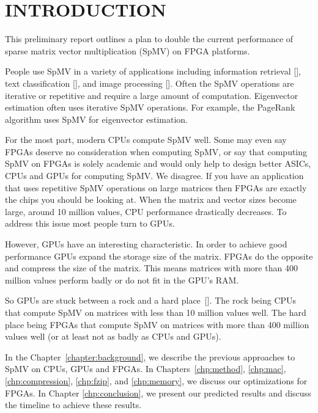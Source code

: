 \chapter{INTRODUCTION}
\label{chapter:introduction}
This preliminary report outlines a plan to double the current performance of sparse matrix vector multiplication (SpMV) on FPGA platforms.
\par People use SpMV in a variety of applications including information retrieval [\cite{prelim:page}], text classification [\cite{prelim:townsend2}], and image processing [\cite{prelim:wang}]. Often the SpMV operations are iterative or repetitive and require a large amount of computation. Eigenvector estimation often uses iterative SpMV operations. For example, the PageRank algorithm uses SpMV for eigenvector estimation.
\par For the most part, modern CPUs compute SpMV well. Some may even say FPGAs deserve no consideration when computing SpMV, or say that computing SpMV on FPGAs is solely academic and would only help to design better ASICs, CPUs and GPUs for computing SpMV. We disagree. If you have  an application that uses repetitive SpMV operations on large matrices then FPGAs are exactly the chips you should be looking at. When the matrix and vector sizes  become large, around 10 million values, CPU performance drastically decreases. To address this issue most people turn to GPUs.
\par However, GPUs have an interesting characteristic. In order to achieve good performance GPUs expand the storage size of the matrix. FPGAs do the opposite and compress the size of the matrix. This means matrices with more than 400 million values perform badly or do not fit in the GPU's RAM.
\par So GPUs are stuck between a rock and a hard place~[\cite{prelim:davis0}]. The rock being CPUs that compute SpMV on matrices with less than 10 million values well. The hard place being FPGAs that compute SpMV on matrices with more than 400 million values well (or at least not as badly as CPUs and GPUs).
\par In the Chapter~\ref{chapter:background}, we describe the previous approaches to SpMV on CPUs, GPUs and FPGAs. In Chapters~\ref{chp:method}, \ref{chp:mac}, \ref{chp:compression}, \ref{chp:fzip}, and \ref{chp:memory}, we discuss our optimizations for FPGAs. In Chapter \ref{chp:conclusion}, we present our predicted results and discuss the timeline to achieve these results.
